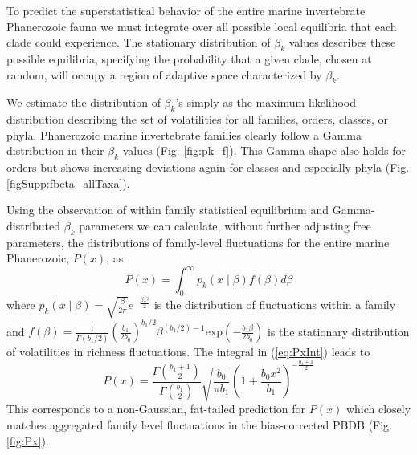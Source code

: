 \documentclass[12pt]{article}
\begin{document}
To predict the superstatistical behavior of the entire marine
invertebrate Phanerozoic fauna we must integrate over all possible
local equilibria that each clade could experience. The stationary
distribution of $\beta_k$ values describes these possible equilibria,
specifying the probability that a given clade, chosen at random, will
occupy a region of adaptive space characterized by $\beta_k$.

We estimate the distribution of $\beta_k$'s simply as the maximum
likelihood distribution describing the set of volatilities for all
families, orders, classes, or phyla. Phanerozoic marine invertebrate
families clearly follow a Gamma distribution in their $\beta_k$ values
(Fig. \ref{fig:pk_f}). This Gamma shape also holds for orders but
shows increasing deviations again for classes and especially phyla
(Fig. \ref{figSupp:fbeta_allTaxa}).

Using the observation of within family statistical equilibrium and
Gamma-distributed $\beta_k$ parameters we can calculate, without
further adjusting free parameters, the distributions of family-level
fluctuations for the entire marine Phanerozoic, $P(x)$, as
\begin{equation}
  P(x) = \int_0^\infty p_k(x \mid \beta) f(\beta) d\beta \label{eq:PxInt}
\end{equation}
where
$p_k(x \mid \beta) = \sqrt{\frac{\beta}{2\pi}} e^{-\frac{\beta
    x^2}{2}}$ is the distribution of fluctuations within a family and
$f(\beta) = \frac{1}{\Gamma(b_1/2)}
\left(\frac{b_1}{2b_0}\right)^{b_1/2} \beta^{(b_1/2) - 1}
\text{exp}\left(-\frac{b_1 \beta}{2 b_0}\right)$ is the stationary
distribution of volatilities in richness fluctuations. The integral in
(\ref{eq:PxInt}) leads to
\begin{equation}
  \label{eq:Px}
  P(x) = \frac{\Gamma\left(\frac{b_1 +
        1}{2}\right)}{\Gamma\left(\frac{b_1}{2}\right)}
  \sqrt{\frac{b_0}{\pi b_1}} \left(1 + \frac{b_0
      x^2}{b_1}\right)^{-\frac{b_1 + 1}{2}}
\end{equation}
This corresponds to a non-Gaussian, fat-tailed prediction for $P(x)$
which closely matches aggregated family level fluctuations in the
bias-corrected PBDB (Fig. \ref{fig:Px}).
\end{document}

